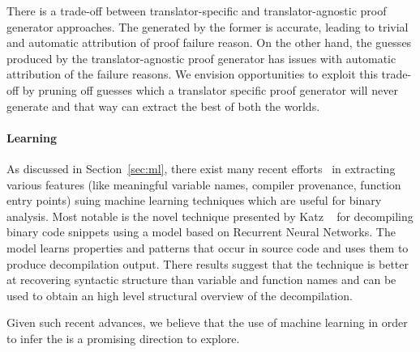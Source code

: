 There is a trade-off between translator-specific and translator-agnostic proof generator approaches. The \syncps generated by the former is accurate, leading to trivial and automatic attribution of proof failure reason. On the other hand, the \syncp guesses produced by the  translator-agnostic proof generator has issues with automatic attribution  of the failure reasons. We envision opportunities to exploit this trade-off by pruning off \syncp  guesses which a translator specific proof generator will never generate and that way can extract the best of both the worlds. 

\paragraph{\textbf{Learning \syncps}}

As discussed in Section~\ref{sec:ml}, there exist many recent efforts~\cite{Jaffe:2018ICPC,Rosenblum2007,Rosenblum:2008,Rosenblum:2010,Rosenblum:2011,Bao:2014,Shin:2015} in extracting various features (like meaningful variable names, compiler provenance, function entry points) suing machine learning techniques which are useful for binary analysis. Most notable is the novel technique presented by Katz \etal~\cite{katz2018rnn}  for decompiling binary code snippets using a model based on Recurrent Neural Networks. The model learns properties and patterns that occur in source code and uses them to produce decompilation output. There results suggest that the technique is better at recovering syntactic structure than variable and function names and can be used to obtain an high level structural  overview of the decompilation.
    
Given such recent advances, we believe that the use of machine learning in order to infer the \syncp is a promising direction to explore.
